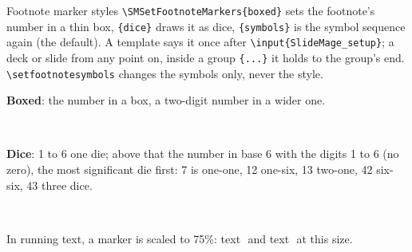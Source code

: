 
\begin{standardframe}{Footnote marker styles}
\footnotesize
\texttt{\textbackslash SMSetFootnoteMarkers\{boxed\}} sets the footnote's number in a thin box,
\texttt{\{dice\}} draws it as dice, \texttt{\{symbols\}} is the symbol sequence again (the default).
A template says it once after \texttt{\textbackslash input\{SlideMage\_setup\}}; a deck or slide from any point on,
inside a group \texttt{\{...\}} it holds to the group's end. \texttt{\textbackslash setfootnotesymbols}
changes the symbols only, never the style.

\vspace{0.8em}
\textbf{Boxed}: the number in a box, a two-digit number in a wider one.

\vspace{0.3em}
{\Large{} \  \  \ }
 {\fontsize{3.2}{4.5}\selectfont{}   }

\vspace{0.8em}
\textbf{Dice}: 1 to 6 one die; above that the number in base 6 with the digits 1 to 6 (no zero), the most significant die first: 7 is one-one, 12 one-six, 13 two-one, 42 six-six, 43 three dice.

\vspace{0.3em}
{\Large{} \  \  \ }
 {\fontsize{3.2}{4.5}\selectfont{}   }

\vspace{0.8em}
In running text, a marker is scaled to 75\%: text\,{}\ and text\,{}\ at this size.
\end{standardframe}
